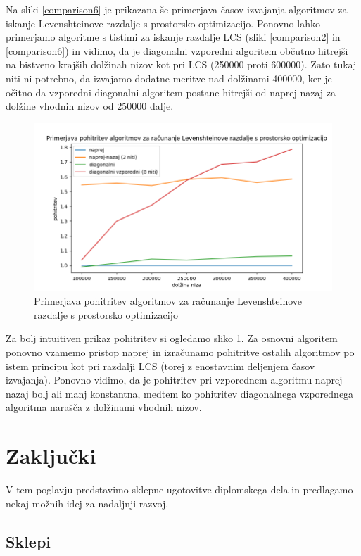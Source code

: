 \documentclass[a4paper,12pt,openright]{book}
\begin{document}
Na sliki \ref{comparison6} je prikazana še primerjava časov izvajanja algoritmov za iskanje Levenshteinove razdalje s prostorsko optimizacijo. Ponovno lahko primerjamo algoritme s tistimi za iskanje razdalje LCS (sliki \ref{comparison2} in \ref{comparison6}) in vidimo, da je diagonalni vzporedni algoritem občutno hitrejši na bistveno krajših dolžinah nizov kot pri LCS (250000 proti 600000). Zato tukaj niti ni potrebno, da izvajamo dodatne meritve nad dolžinami 400000, ker je očitno da vzporedni diagonalni algoritem postane hitrejši od naprej-nazaj za dolžine vhodnih nizov od 250000 dalje. 

\begin{figure}[H]
\centering
\includegraphics[width=1.0\textwidth]{plots/LevenshteinAcceleration.png}
\caption{Primerjava pohitritev algoritmov za računanje Levenshteinove razdalje s prostorsko optimizacijo}
\label{comparison61}
\end{figure}

Za bolj intuitiven prikaz pohitritev si ogledamo sliko \ref{comparison61}. Za osnovni algoritem ponovno vzamemo pristop naprej in izračunamo pohitritve ostalih algoritmov po istem principu kot pri razdalji LCS (torej z enostavnim deljenjem časov izvajanja). Ponovno vidimo, da je pohitritev pri vzporednem algoritmu naprej-nazaj bolj ali manj konstantna, medtem ko pohitritev diagonalnega vzporednega algoritma narašča z dolžinami vhodnih nizov. 

\chapter{Zaključki}

V tem poglavju predstavimo sklepne ugotovitve diplomskega dela in predlagamo nekaj možnih idej za nadaljnji razvoj.

\section{Sklepi}
\end{document}
